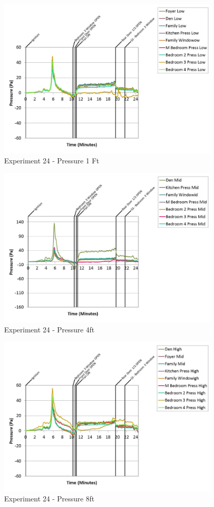 \documentclass{article}
\begin{document}
\begin{appendices}
	\clearpage

	\begin{figure}[h!]
		\centering
		\includegraphics[height=3.05in]{0_Images/Results_Charts/Exp_24_Charts/Pressure1Ft.pdf}
		\caption{Experiment 24 - Pressure 1 Ft}
	\end{figure}
 

	\begin{figure}[h!]
		\centering
		\includegraphics[height=3.05in]{0_Images/Results_Charts/Exp_24_Charts/Pressure4ft.pdf}
		\caption{Experiment 24 - Pressure 4ft}
	\end{figure}
 
	\clearpage

	\begin{figure}[h!]
		\centering
		\includegraphics[height=3.05in]{0_Images/Results_Charts/Exp_24_Charts/Pressure8ft.pdf}
		\caption{Experiment 24 - Pressure 8ft}
	\end{figure}
 


\end{appendices}
\end{document}
